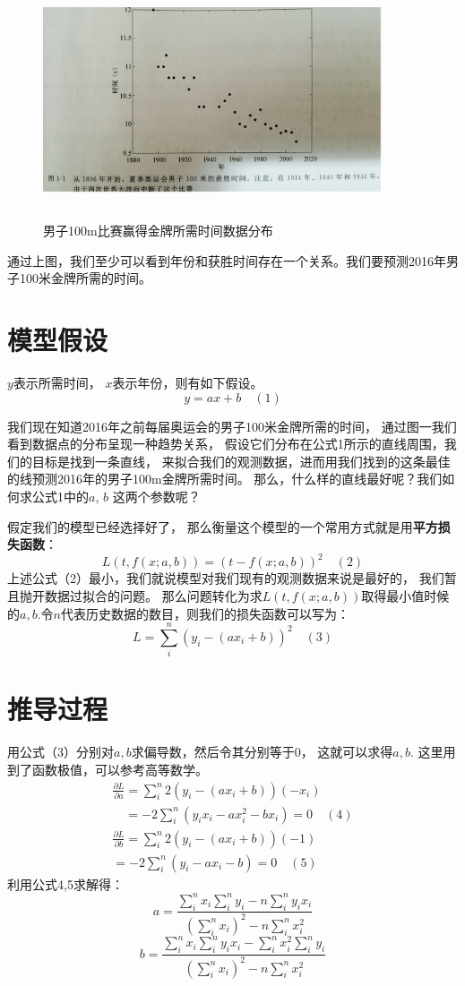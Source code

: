 \documentclass[a4paper,12pt]{book}
\begin{document}
    \begin{figure}[h]
        \centering
        \includegraphics[width=10cm,height=7cm]{1_1}
        \caption{男子100m比赛赢得金牌所需时间数据分布}
    \end{figure}
    通过上图，我们至少可以看到年份和获胜时间存在一个关系。我们要预测2016年男子100米金牌所需的时间。

    \section{模型假设}
    $y$表示所需时间， $x$表示年份，则有如下假设。
    $$ y = ax+b \quad(1)$$


    我们现在知道2016年之前每届奥运会的男子100米金牌所需的时间，
    通过图一我们看到数据点的分布呈现一种趋势关系，
    假设它们分布在公式1所示的直线周围，我们的目标是找到一条直线，
    来拟合我们的观测数据，进而用我们找到的这条最佳的线预测2016年的男子100m金牌所需时间。
    那么，什么样的直线最好呢？我们如何求公式1中的$a$, $b$ 这两个参数呢？
    

    假定我们的模型已经选择好了，
    那么衡量这个模型的一个常用方式就是用\textbf{平方损失函数}：
    $$L(t,f(x;a,b)) = (t-f(x;a,b))^2 \quad(2)$$
    上述公式（2）最小，我们就说模型对我们现有的观测数据来说是最好的，
    我们暂且抛开数据过拟合的问题。
    那么问题转化为求$L(t,f(x;a,b))$取得最小值时候的$a,b$.令$n$代表历史数据的数目，则我们的损失函数可以写为：
    $$L=\sum_{i}^n(y_i-(ax_i+b))^2\quad(3)$$
        
    \section{推导过程}


    用公式（3）分别对$a,b$求偏导数，然后令其分别等于0， 这就可以求得$a, b$. 这里用到了函数极值，可以参考高等数学。
    $$
    \begin{array}{ll}\frac {\partial L}{\partial a} = \sum_{i}^n
    2(y_i-(ax_i+b))(-x_i)\\
    \quad=-2\sum_i^n(y_ix_i-ax_i^2-bx_i) =0 \quad (4)\\
    \frac{\partial L}{\partial b}=\sum_i^n2(y_i-(ax_i+b))(-1)\\=-2\sum_i^n(y_i-ax_i-b)=0\quad(5)
    \end{array}
    $$
    利用公式4,5求解得：
    $$
    a=\frac{\sum_i^nx_i\sum_i^ny_i-n\sum_i^ny_ix_i}
    {(\sum_i^nx_i)^2-n\sum_i^nx_i^2}
    $$
    $$
    b=\frac{\sum_i^nx_i\sum_i^ny_ix_i-\sum_i^nx_i^2\sum_i^ny_i}{(\sum_i^nx_i)^2-n\sum_i^nx_i^2}
    $$
\end{document}
